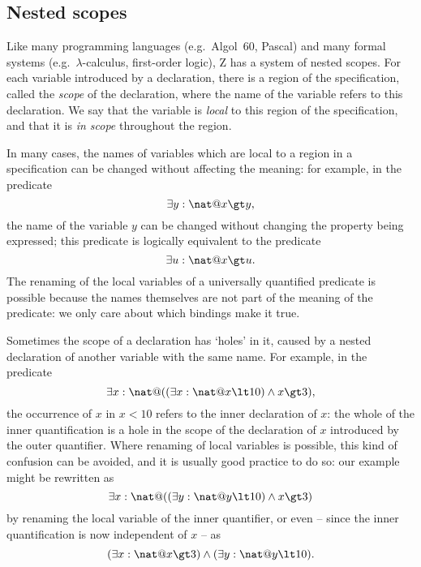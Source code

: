\subsection{Nested scopes}

\new Like many programming languages (e.g.\ Algol~60, Pascal) and
many formal systems (e.g.\ $\lambda$-calculus, first-order logic), Z
has a system of nested scopes. For each
variable introduced by a declaration, there is a region of the
specification, called the {\em scope\/}%
of the declaration, where the name of the variable refers to this
declaration. We say that the variable is {\em local}%
to this region of the specification, and that it is {\em in scope\/}
throughout the region.

In many cases, the names of variables which are local to a region in a
specification can be changed without affecting the meaning: for
example, in the predicate
\[ \exists y: \nat @ x \gt y, \]
the name of the variable $y$ can be changed without changing the
property being expressed; this predicate is logically equivalent to
the predicate
\[ \exists u: \nat @ x \gt u. \]
The renaming of the local variables of a universally
quantified predicate is possible because the names themselves are
not part of the meaning of the predicate: we only care about which
bindings make it true.

Sometimes the scope of a declaration has `holes' in it, caused by a
nested declaration of another variable with the same name. For
example, in the predicate
\[ \exists x: \nat @ ((\exists x: \nat @ x \lt 10) \land x \gt 3), \]
the occurrence of $x$ in $x \lt 10$ refers to the inner declaration of
$x$: the whole of the inner quantification is a hole in the scope of
the declaration of $x$ introduced by the outer quantifier.  Where renaming
of local variables is possible, this kind of confusion can be avoided,
and it is usually good practice to do so: our example might be
rewritten as
\[ \exists x: \nat @ 
	((\exists y: \nat @ y \lt 10) \land x \gt 3) \]
by renaming the local variable of the inner quantifier, or even --
since the inner quantification is now independent of $x$ -- as
\[ (\exists x: \nat @ x \gt 3)
	\land (\exists y: \nat @ y \lt 10). \]

